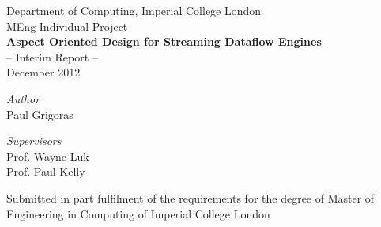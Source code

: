 \begin{titlepage}

\begin{center}

{\Large Department of Computing, Imperial College London}
\HRule \\[0.4cm]
{\Large MEng Individual Project} \\ [5cm]

{\huge \bfseries Aspect Oriented Design for Streaming Dataflow Engines}\\[0.5cm]
{\Large -- Interim Report --}\\[0.5cm]
{\Large December 2012} \\ [3cm]

\begin{minipage}[t]{0.4\textwidth}
\begin{flushleft} \large
\emph{Author} \\[0.5cm]
{Paul Grigoras} \\[0.5cm]

\end{flushleft}
\end{minipage}
\begin{minipage}[t]{0.4\textwidth}
\begin{flushright} \large
\emph{Supervisors} \\[0.5cm]
Prof. Wayne Luk \\[0.3cm]
Prof. Paul Kelly
\end{flushright}
\end{minipage}

\vfill

\begin{minipage}{0.7\textwidth}
\begin{center}
Submitted in part fulfilment of the requirements for the degree of
Master of Engineering in Computing of Imperial College London
\end{center}
\end{minipage}

\end{center}
\end{titlepage}
